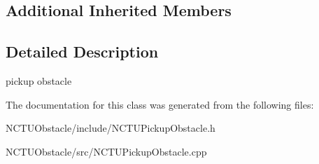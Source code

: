 \subsection*{Additional Inherited Members}


\subsection{Detailed Description}
pickup obstacle 

The documentation for this class was generated from the following files\+:\begin{DoxyCompactItemize}
\item 
N\+C\+T\+U\+Obstacle/include/N\+C\+T\+U\+Pickup\+Obstacle.\+h\item 
N\+C\+T\+U\+Obstacle/src/N\+C\+T\+U\+Pickup\+Obstacle.\+cpp\end{DoxyCompactItemize}
